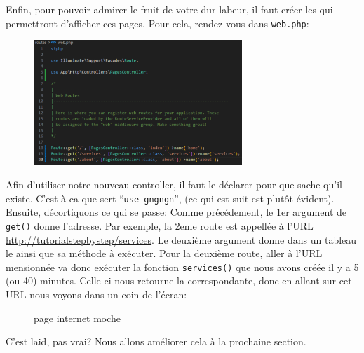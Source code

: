 \newpage

Enfin, pour pouvoir admirer le fruit de votre dur labeur, il faut créer les \routes{} qui permettront d'afficher ces pages. Pour cela, rendez-vous dans \verb|web.php|:

\begin{figure}
    \vspace{-0.5cm}
    \includegraphics[width=0.7\textwidth]{figures-C1/3_premieres_routes.pdf}
\end{figure}
Afin d'utiliser notre nouveau controller, il faut le déclarer pour que \laravel{} sache qu'il existe. C'est à ca que sert ``\verb|use gngngn|'', (ce qui est suit est plutôt évident).
Ensuite, décortiquons ce qui se passe: Comme précédement, le 1er argument de \verb|get()| donne l'adresse. Par exemple, la 2eme route est appellée à l'URL \url{http://tutorialstepbystep/services}. Le deuxième argument donne dans un tableau le \controller{} ainsi que sa méthode à exécuter. Pour la deuxième route, aller à l'URL mensionnée va donc exécuter la fonction \verb|services()| que nous avons créée il y a 5 (ou 40) minutes. Celle ci nous retourne la \view{} correspondante, donc en allant sur cet URL nous voyons dans un coin de l'écran:

\begin{figure}[!h]
    \centering
    \caption{page internet moche}
\end{figure}

C'est laid, pas vrai? Nous allons améliorer cela à la prochaine section.

\newpage

